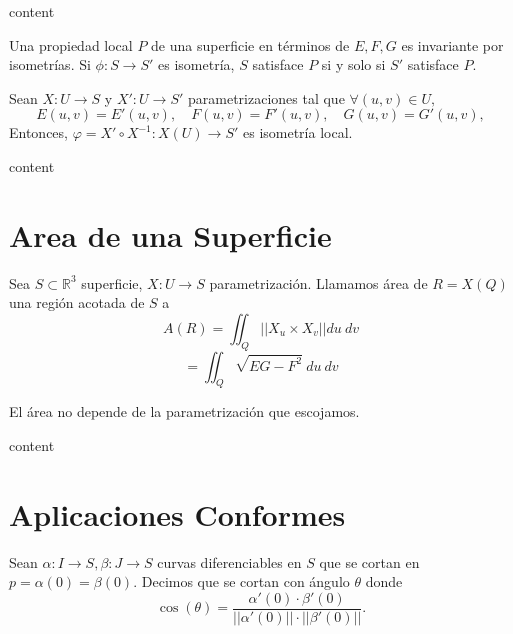 \begin{dem}
  content
\end{dem}

\begin{cor}
  Una propiedad local $P$ de una superficie en términos de $E, F, G$ es invariante por isometrías. Si $\phi : S \to S'$ es isometría, $S$ satisface $P$ si y solo si $S'$ satisface $P$.
\end{cor}

\begin{prop}
  Sean $X : U \to S$ y $X' : U \to S'$ parametrizaciones tal que $\forall (u, v) \in U,$
  \[ 
    E(u, v) = E'(u, v), \quad F(u, v) = F'(u, v), \quad G(u, v) = G'(u, v),
  \] 
  Entonces, $\varphi = X' \circ X^{-1} : X(U) \to S'$ es isometría local.
\end{prop}

\begin{dem}
  content
\end{dem}

\section{Area de una Superficie}

\begin{defn}
  Sea $S \subset \mathbb{R}^{3}$ superficie, $X : U \to S$ parametrización. Llamamos área de $R = X(Q)$ una región acotada de $S$ a
  \[ 
    A(R) = \iint_{Q}^{} ||X_{u} \times X_{v}|| du \ dv 
  \] 
  \[ 
    = \iint_{Q}^{} \sqrt{EG - F^{2}} \ du \ dv 
  \] 
\end{defn}

\begin{obs}
  El área no depende de la parametrización que escojamos.
\end{obs}

\begin{dem}
  content
\end{dem}

\section{Aplicaciones Conformes}

\begin{defn}
  Sean $\alpha : I \to S, \beta : J \to S$ curvas diferenciables en $S$ que se cortan en $p = \alpha(0) = \beta(0)$. Decimos que se cortan con ángulo $\theta$ donde
  \[ 
    \cos(\theta) = \frac{\alpha'(0) \cdot \beta'(0)}{||\alpha'(0)||\cdot ||\beta'(0)||}.
  \] 
\end{defn}

